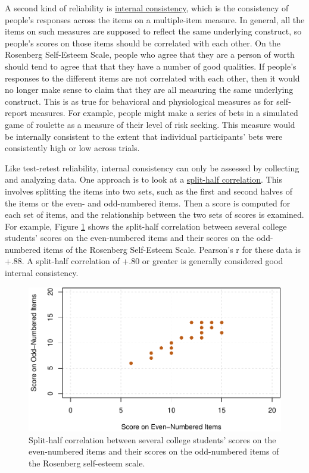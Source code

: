 \documentclass[
]{krantz}
\begin{document}
A second kind of reliability is \protect\hyperlink{internal-consistency-1}{internal consistency}, which is the consistency of people's responses across the items on a multiple-item measure. In general, all the items on such measures are supposed to reflect the same underlying construct, so people's scores on those items should be correlated with each other. On the Rosenberg Self-Esteem Scale, people who agree that they are a person of worth should tend to agree that that they have a number of good qualities. If people's responses to the different items are not correlated with each other, then it would no longer make sense to claim that they are all measuring the same underlying construct. This is as true for behavioral and physiological measures as for self-report measures. For example, people might make a series of bets in a simulated game of roulette as a measure of their level of risk seeking. This measure would be internally consistent to the extent that individual participants' bets were consistently high or low across trials.

Like test-retest reliability, internal consistency can only be assessed by collecting and analyzing data. One approach is to look at a \protect\hyperlink{split-half-correlation}{split-half correlation}. This involves splitting the items into two sets, such as the first and second halves of the items or the even- and odd-numbered items. Then a score is computed for each set of items, and the relationship between the two sets of scores is examined. For example, Figure \ref{fig:internal} shows the split-half correlation between several college students' scores on the even-numbered items and their scores on the odd-numbered items of the Rosenberg Self-Esteem Scale. Pearson's r for these data is +.88. A split-half correlation of +.80 or greater is generally considered good internal consistency.

\begin{figure}

{\centering \includegraphics[width=0.8\linewidth]{06-measurement_files/figure-latex/internal-1} 

}

\caption{Split-half correlation between several college students’ scores on the even-numbered items and their scores on the odd-numbered items of the Rosenberg self-esteem scale.}\label{fig:internal}
\end{figure}
\end{document}
